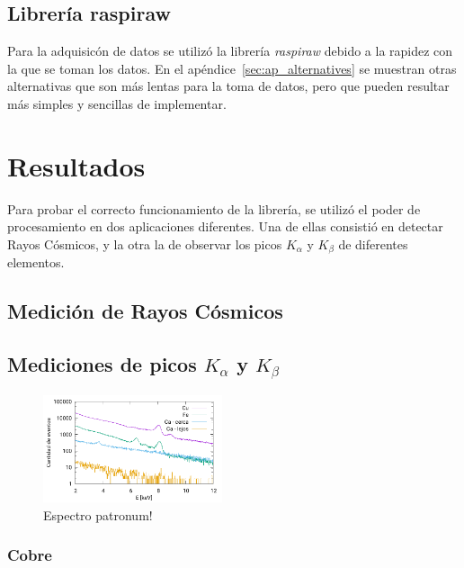 \documentclass[twoside,twocolumn]{article}
\begin{document}
    \subsection{Librería raspiraw}
      Para la adquisicón de datos se utilizó la librería {\it raspiraw}\cite{raspiraw} debido a la rapidez con la que se toman los datos.
      En el apéndice~\ref{sec:ap_alternatives} se muestran otras alternativas que son más lentas para la toma de datos,
      pero que pueden resultar más simples y sencillas de implementar.


  \section{Resultados}
    Para probar el correcto funcionamiento de la librería, se utilizó el poder de procesamiento en dos aplicaciones diferentes.
    Una de ellas consistió en detectar Rayos Cósmicos, y la otra la de observar los picos $K_{\alpha}$ y $K_{\beta}$ de diferentes elementos.
    
    \subsection{Medición de Rayos Cósmicos}

    \subsection{Mediciones de picos $K_{\alpha}$ y $K_{\beta}$}

    \begin{figure}[h]
      \includegraphics[width=0.47\textwidth]{figures/x-ray_spectrum.pdf}
      \caption{Espectro patronum!}
      \label{fig:spectrum_x-ray}
    \end{figure}

      \subsubsection{Cobre}
\end{document}
